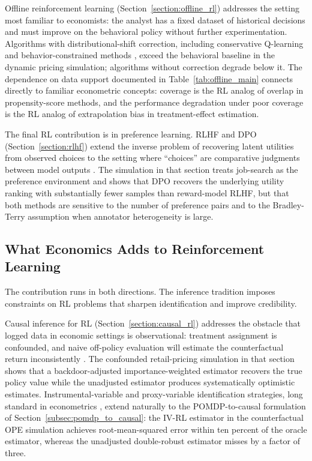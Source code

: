 Offline reinforcement learning (Section~\ref{section:offline_rl}) addresses the setting most familiar to economists: the analyst has a fixed dataset of historical decisions and must improve on the behavioral policy without further experimentation.
Algorithms with distributional-shift correction, including conservative Q-learning \citep{Kumar2020} and behavior-constrained methods \citep{Fujimoto2019b}, exceed the behavioral baseline in the dynamic pricing simulation; algorithms without correction degrade below it.
The dependence on data support documented in Table~\ref{tab:offline_main} connects directly to familiar econometric concepts: coverage is the RL analog of overlap in propensity-score methods, and the performance degradation under poor coverage is the RL analog of extrapolation bias in treatment-effect estimation.

The final RL contribution is in preference learning.
RLHF and DPO (Section~\ref{section:rlhf}) extend the inverse problem of recovering latent utilities from observed choices to the setting where ``choices'' are comparative judgments between model outputs \citep{christiano:2017, ouyang2022training, rafailov2023direct}.
The simulation in that section treats job-search as the preference environment and shows that DPO recovers the underlying utility ranking with substantially fewer samples than reward-model RLHF, but that both methods are sensitive to the number of preference pairs and to the Bradley-Terry assumption when annotator heterogeneity is large.

\subsection{What Economics Adds to Reinforcement Learning}

The contribution runs in both directions.
The inference tradition imposes constraints on RL problems that sharpen identification and improve credibility.

Causal inference for RL (Section~\ref{section:causal_rl}) addresses the obstacle that logged data in economic settings is observational: treatment assignment is confounded, and naive off-policy evaluation will estimate the counterfactual return inconsistently \citep{precup2000, pearl2009causality}.
The confounded retail-pricing simulation in that section shows that a backdoor-adjusted importance-weighted estimator recovers the true policy value while the unadjusted estimator produces systematically optimistic estimates.
Instrumental-variable and proxy-variable identification strategies, long standard in econometrics \citep{robins1994estimation}, extend naturally to the POMDP-to-causal formulation of Section~\ref{subsec:pomdp_to_causal}: the IV-RL estimator in the counterfactual OPE simulation achieves root-mean-squared error within ten percent of the oracle estimator, whereas the unadjusted double-robust estimator misses by a factor of three.

